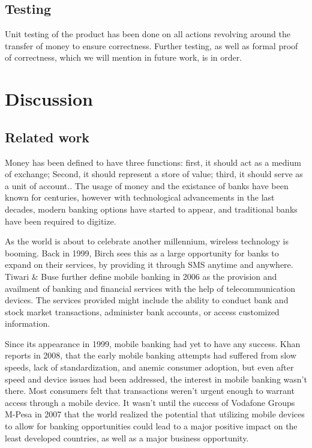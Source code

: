 \documentclass[11pt, a4paper]{article}
\begin{document}

\subsection{Testing} %
\label{sub:testing}
Unit testing of the product has been done on all actions revolving around the transfer of money to ensure correctness. Further testing, as well as formal proof of correctness, which we will mention in future work, is in order.

\section{Discussion}
\subsection{Related work} %
\label{sub:related_work}

Money has been defined to have three functions: first, it should act as a medium of exchange; Second, it should represent a store of value; third, it should serve as a unit of account.\cite{carruthers}. The usage of money and the existance of banks have been known for centuries, however with technological advancements in the last decades, modern banking options have started to appear, and traditional banks have been required to digitize.

As the world is about to celebrate another millennium, wireless technology is booming. Back in 1999, Birch\cite{Birch1999MobileFS} sees this as a large opportunity for banks to expand on their services, by providing it through SMS anytime and anywhere. Tiwari \& Buse\cite{tiwaribuse} further define mobile banking in 2006 as the provision and availment of banking and financial services with the help of telecommunication devices. The services provided might include the ability to conduct bank and stock market transactions, administer bank accounts, or access customized information.

Since its appearance in 1999, mobile banking had yet to have any success. Khan\cite{khan} reports in 2008, that the early mobile banking attempts had suffered from slow speeds, lack of standardization, and anemic consumer adoption, but even after speed and device issues had been addressed, the interest in mobile banking wasn't there. Most consumers felt that transactions weren't urgent enough to warrant access through a mobile device. It wasn't until the success of Vodafone Groups M-Pesa in 2007\cite{jacksuri} that the world realized the potential that utilizing mobile devices to allow for banking opportunities could lead to a major positive impact on the least developed countries, as well as a major business opportunity.
\end{document}
